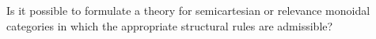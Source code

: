 \begin{ex}\label{ex:semicart-relevance-strucadm}
  Is it possible to formulate a theory for semicartesian or relevance monoidal categories in which the appropriate structural rules are admissible?
\end{ex}


\ChapterExercises


